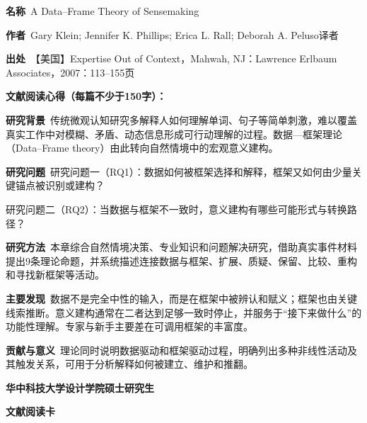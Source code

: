 \vspace{0.25em}
\noindent\underline{}\par
\vspace{0.35em}
\noindent\textbf{名称}\ A Data–Frame Theory of Sensemaking\par
\noindent\textbf{作者}\ Gary Klein; Jennifer K. Phillips; Erica L. Rall; Deborah A. Peluso\quad 译者\par
\noindent\textbf{出处}\ 【美国】Expertise Out of Context，Mahwah, NJ：Lawrence Erlbaum Associates，2007：113–155\quad 页\par
\vspace{0.35em}
\noindent\textbf{文献阅读心得（每篇不少于150字）：}\par
\noindent\textbf{研究背景}\ 传统微观认知研究多解释人如何理解单词、句子等简单刺激，难以覆盖真实工作中对模糊、矛盾、动态信息形成可行动理解的过程。数据—框架理论（Data–Frame theory）由此转向自然情境中的宏观意义建构。\par
\noindent\textbf{研究问题}\ 研究问题一（RQ1）：数据如何被框架选择和解释，框架又如何由少量关键锚点被识别或建构？\par
研究问题二（RQ2）：当数据与框架不一致时，意义建构有哪些可能形式与转换路径？\par
\noindent\textbf{研究方法}\ 本章综合自然情境决策、专业知识和问题解决研究，借助真实事件材料提出9条理论命题，并系统描述连接数据与框架、扩展、质疑、保留、比较、重构和寻找新框架等活动。\par
\noindent\textbf{主要发现}\ 数据不是完全中性的输入，而是在框架中被辨认和赋义；框架也由关键线索推断。意义建构通常在二者达到足够一致时停止，并服务于“接下来做什么”的功能性理解。专家与新手主要差在可调用框架的丰富度。\par
\noindent\textbf{贡献与意义}\ 理论同时说明数据驱动和框架驱动过程，明确列出多种非线性活动及其触发关系，可用于分析解释如何被建立、维护和推翻。\par
\clearpage
\begin{center}
{\songti\bfseries\fontsize{18.5pt}{27.75pt}\selectfont 华中科技大学设计学院硕士研究生\par}
{\songti\bfseries\fontsize{18.5pt}{27.75pt}\selectfont 文献阅读卡\par}
\end{center}
\vspace{0.25em}
\noindent\underline{}\par
\vspace{0.35em}
